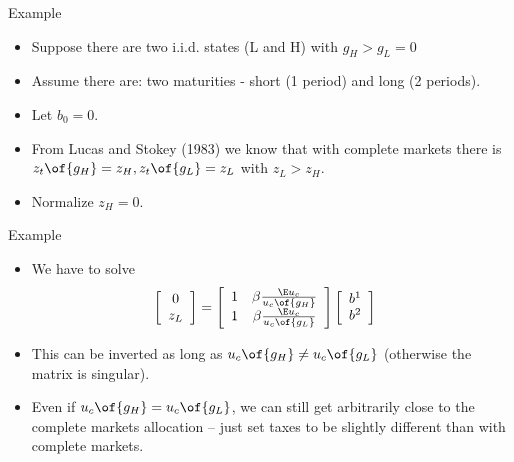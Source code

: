 \documentclass[11pt,xcolor={dvipsnames},aspectratio=159,hyperref={pdftex,pdfpagemode=UseNone,hidelinks,pdfdisplaydoctitle=true},usepdftitle=false]{beamer}
\begin{document}
\begin{frame}
\end{frame}

\begin{frame}{Example}
    \begin{itemize}
        \item Suppose there are two i.i.d. states (L and H) with $g_H > g_L = 0$
        \item Assume there are: two maturities - short (1 period) and long (2 periods). 
        \item Let $b_0 = 0$.
        \item From Lucas and Stokey (1983) we know that with complete markets there is $z_t\of{g_H} =z_H, z_t\of{g_L}=z_L$ with $z_L >  z_H $. 
        \item Normalize $z_H =0$. 
    \end{itemize}
\end{frame}

\begin{frame}{Example}
    \begin{itemize}
        \item We have to solve 
        \begin{align*}
            \left[\begin{array}{c}
            0\\
            z_{L}
            \end{array}\right] & =\left[\begin{array}{cc}
            1 & \beta \frac{\E u_c}{u_c\of{g_H}}\\
            1 & \beta \frac{\E u_c}{u_c\of{g_L}}
            \end{array}\right]\left[\begin{array}{c}
            b^1\\
            b^2\\
            \end{array}\right]
            \end{align*}
        \item This can be inverted as long as $u_c\of{g_H}\neq u_c\of{g_L}$ (otherwise the matrix is singular).
        \item Even if $u_c\of{g_H}=u_c\of{g_L}$, we can still get arbitrarily close to the complete markets allocation -- just set taxes to be slightly different than with complete markets.
    \end{itemize}
\end{frame}
\end{document}
